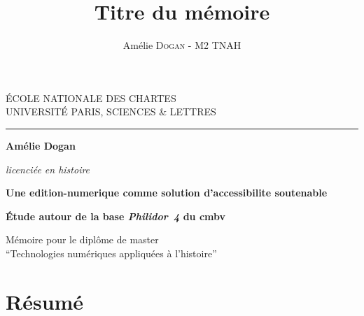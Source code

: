 \documentclass[12pt,twoside]{book}
\author{Amélie \textsc{Dogan} - M2 TNAH}
\title{Titre du mémoire}
\begin{document}
	\begin{titlepage}
		\begin{center}
			
			\bigskip
			
			\begin{large}				
				ÉCOLE NATIONALE DES CHARTES\\
				UNIVERSITÉ PARIS, SCIENCES \& LETTRES
			\end{large}
			\begin{center}\rule{2cm}{0.02cm}\end{center}
			
			\bigskip
			\bigskip
			\bigskip
			\begin{Large}
				\textbf{Amélie Dogan}\\
			\end{Large}
			\begin{normalsize} \textit{licenciée en histoire}
			\end{normalsize}
			
			\bigskip
			\bigskip
			\bigskip
			
			\begin{Huge}
				\textbf{Une \gls{edition-numerique} comme solution d'\gls{accessibilite} soutenable}\\
			\end{Huge}
			\bigskip
			\bigskip
			\begin{LARGE}
				\textbf{Étude autour de la base \textit{Philidor~4} du \gls{cmbv}}\\
			\end{LARGE}
			
			\bigskip
			\bigskip
			\bigskip
			\begin{large}
			\end{large}
			\vfill
			
			\begin{large}
				Mémoire 
				pour le diplôme de master \\
				\enquote{Technologies numériques appliquées à l'histoire} \\
			\end{large}
			
		\end{center}
	\end{titlepage}
	
	\thispagestyle{empty}	
	\cleardoublepage
	
	\frontmatter
	
	\chapter{Résumé}
	
\end{document}
